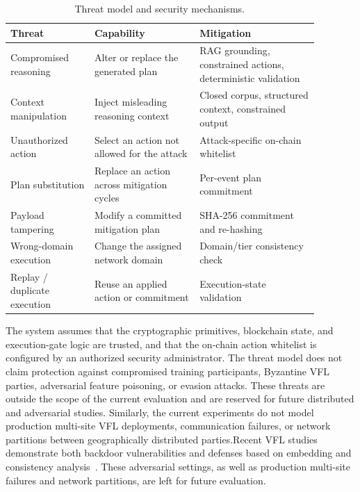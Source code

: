 \documentclass[10pt, conference]{IEEEtran}
\begin{document}
\begin{table}[t]
\centering
\caption{Threat model and security mechanisms.}
\label{tab:threat_model}
\small
\begin{tabular}{p{0.24\linewidth}p{0.30\linewidth}p{0.34\linewidth}}
\hline
\textbf{Threat} & \textbf{Capability} & \textbf{Mitigation} \\
\hline

Compromised reasoning
&
Alter or replace the generated plan
&
RAG grounding, constrained actions, deterministic validation
\\

Context manipulation
&
Inject misleading reasoning context
&
Closed corpus, structured context, constrained output
\\

Unauthorized action
&
Select an action not allowed for the attack
&
Attack-specific on-chain whitelist
\\

Plan substitution
&
Replace an action across mitigation cycles
&
Per-event plan commitment
\\

Payload tampering
&
Modify a committed mitigation plan
&
SHA-256 commitment and re-hashing
\\

Wrong-domain execution
&
Change the assigned network domain
&
Domain/tier consistency check
\\

Replay / duplicate execution
&
Reuse an applied action or commitment
&
Execution-state validation
\\

\hline
\end{tabular}
\end{table}


The system assumes that the cryptographic primitives, blockchain state,
and execution-gate logic are trusted, and that the on-chain action
whitelist is configured by an authorized security administrator. The
threat model does not claim protection against compromised training
participants, Byzantine VFL parties, adversarial feature poisoning, or
evasion attacks. These threats are outside the scope of the current
evaluation and are reserved for future distributed and adversarial
studies. Similarly, the current experiments do not model production
multi-site VFL deployments, communication failures, or network
partitions between geographically distributed parties.Recent VFL studies demonstrate both backdoor vulnerabilities and defenses based on embedding and consistency analysis~\cite{naseri2024badvfl,chen2025ubd,hu2026filter}. These adversarial settings, as well as production multi-site failures and network partitions, are left for future evaluation.
\end{document}
